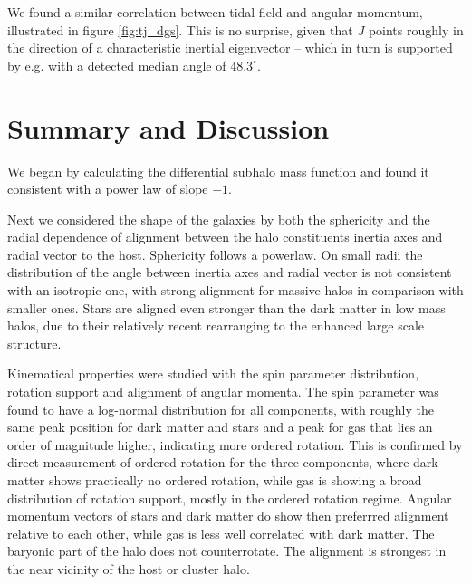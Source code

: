\documentclass[useAMS,usenatbib]{mn2e}
\begin{document}
We found a similar correlation between tidal field and angular momentum,
illustrated in figure \ref{fig:tj_dgs}. This is no surprise, given that $J$
points roughly in the direction of a characteristic inertial eigenvector --
which in turn is supported by e.g. \cite{Croft2008} with a detected median
angle of $48.3^\circ$.
%
%
\section{Summary and Discussion}
\label{chap:disc}
%
We began by calculating the differential subhalo mass function and found it
consistent with a power law of slope $-1$.

Next we considered the shape of the galaxies by both the sphericity and the
radial dependence of alignment between the halo constituents inertia axes and
radial vector to the host. Sphericity follows a powerlaw. On small radii the
distribution of the angle between inertia axes and radial vector is not
consistent with an isotropic one, with strong alignment for massive halos in
comparison with smaller ones. Stars are aligned even stronger than the dark
matter in low mass halos, due to their relatively recent rearranging to the
enhanced large scale structure.

Kinematical properties were studied with the spin parameter distribution,
rotation support and alignment of angular momenta. The spin parameter was
found to have a log-normal distribution for all components, with roughly the
same peak position for dark matter and stars and a peak for gas that lies an
order of magnitude higher, indicating more ordered rotation. This is confirmed
by direct measurement of ordered rotation for the three components, where dark
matter shows practically no ordered rotation, while gas is showing a broad
distribution of rotation support, mostly in the ordered rotation
regime. Angular momentum vectors of stars and dark matter do show then
preferrred alignment relative to each other, while gas is less well correlated
with dark matter. The baryonic part of the halo does not counterrotate. The
alignment is strongest in the near vicinity of the host or cluster halo.
\end{document}
